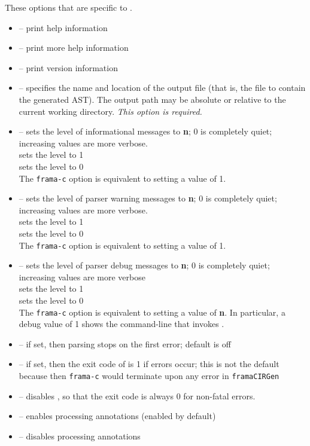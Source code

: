 These options that are specific to \irg.
\begin{itemize}
	\item {} -- print help information
	\item {} -- print more help information
	\item {} -- print version information
	\item {} -- specifies the name and location of the output file (that is, the file to contain the generated AST). The output path may be absolute or relative to the current working directory. \textit{This option is required.}
	\item {} -- sets the level of informational messages to \textbf{n}; 0 is completely quiet; increasing values are
	more verbose. \\
	 sets the level to 1 \\
	 sets the level to 0\\
	 The \lstinline|frama-c| option  is equivalent to setting a value of 1.
	
	\item {} -- sets the level of parser warning messages to \textbf{n}; 0 is completely quiet; increasing values are
more verbose.\\
  sets the level to 1\\
 sets the level to 0\\
The \lstinline|frama-c| option  is equivalent to setting a value of 1.

	\item {} -- sets the level of parser debug messages to \textbf{n}; 0 is completely quiet; increasing values are
more verbose\\
  sets the level to 1\\
 sets the level to 0\\
The \lstinline|frama-c| option  is equivalent to setting a value of \textbf{n}.
In particular, a debug value of 1 shows the command-line that invokes \irg.

	\item {} -- if set, then parsing stops on the first error; default is off
	\item {} -- if set, then the exit code of \irg is 1 if errors occur; this is not the default because then \lstinline|frama-c| would terminate upon
	any error in \lstinline|framaCIRGen|
	\item {} -- disables , so that the exit code is always 0 for non-fatal errors.

	\item {} -- enables processing \acslpp annotations (enabled by default)
	\item {} -- disables processing \acslpp annotations
	
\end{itemize}

